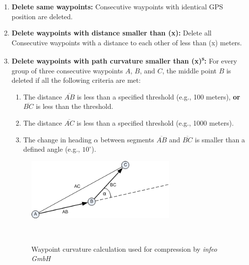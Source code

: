 \documentclass[a4paper,12pt,twoside]{scrreprt}
\begin{document}
\begin{enumerate}
  \item \textbf{Delete same waypoints:} Consecutive waypoints with identical
        GPS position are deleted.
  \item \textbf{Delete waypoints with distance smaller than (x):} Delete all
        Consecutive waypoints with a distance to each other of less than (x)
        meters.
  \item \textbf{Delete waypoints with path curvature smaller than
          (x)\textsuperscript{s}:} For every group of three consecutive
        waypoints \( A \), \( B \), and \( C \), the middle point \( B \) is
        deleted if
        all the following criteria are met:
        \begin{enumerate}
          \item The distance \( \overline{AB} \) is less than a specified
                threshold (e.g., 100 meters), \textbf{or} \( \overline{BC} \)
                is less than the
                threshold.
          \item The distance \( \overline{AC} \) is less than a specified
                threshold (e.g., 1000 meters).
          \item The change in heading \( \alpha \) between segments \(
                \overline{AB} \) and \( \overline{BC} \) is smaller than a
                defined angle (e.g.,
                \(10^\circ\)).
        \end{enumerate}
        \begin{figure}[H]
          \centering
          \vspace{-1em}

          \includegraphics[width=0.7\textwidth]{Figures/problem_definition/Aufzeichnune-komprimieren-winkelreduktion.png}
          \caption{Waypoint curvature calculation used for compression by
            \textit{infeo GmbH}}~\cite{noauthor_route_nodate}
          \label{fig:waypoint_curvature_calculation}
          \vspace{-1em}
        \end{figure}
        \FloatBarrier

\end{enumerate}
\end{document}
